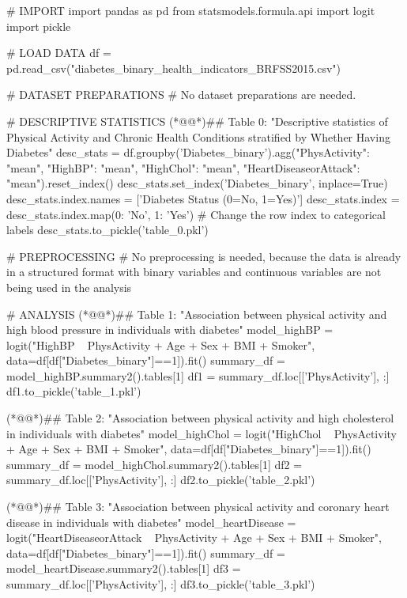 \documentclass[11pt]{article}
\begin{document}
\begin{python}

# IMPORT
import pandas as pd
from statsmodels.formula.api import logit
import pickle

# LOAD DATA
df = pd.read_csv("diabetes_binary_health_indicators_BRFSS2015.csv")

# DATASET PREPARATIONS
# No dataset preparations are needed.

# DESCRIPTIVE STATISTICS
(*@@*)## Table 0: "Descriptive statistics of Physical Activity and Chronic Health Conditions stratified by Whether Having Diabetes"
desc_stats = df.groupby('Diabetes_binary').agg({"PhysActivity": "mean", 
                                                "HighBP": "mean",
                                                "HighChol": "mean",
                                                "HeartDiseaseorAttack": "mean"}).reset_index()
desc_stats.set_index('Diabetes_binary', inplace=True)
desc_stats.index.names = ['Diabetes Status (0=No, 1=Yes)']
desc_stats.index = desc_stats.index.map({0: 'No', 1: 'Yes'})  # Change the row index to categorical labels
desc_stats.to_pickle('table_0.pkl')

# PREPROCESSING 
# No preprocessing is needed, because the data is already in a structured format with binary variables and continuous variables are not being used in the analysis

# ANALYSIS
(*@@*)## Table 1: "Association between physical activity and high blood pressure in individuals with diabetes"
model_highBP = logit("HighBP ~ PhysActivity + Age + Sex + BMI + Smoker", data=df[df["Diabetes_binary"]==1]).fit()
summary_df = model_highBP.summary2().tables[1]
df1 = summary_df.loc[['PhysActivity'], :]
df1.to_pickle('table_1.pkl')

(*@@*)## Table 2: "Association between physical activity and high cholesterol in individuals with diabetes"
model_highChol = logit("HighChol ~ PhysActivity + Age + Sex + BMI + Smoker", data=df[df["Diabetes_binary"]==1]).fit()
summary_df = model_highChol.summary2().tables[1]
df2 = summary_df.loc[['PhysActivity'], :]
df2.to_pickle('table_2.pkl')

(*@@*)## Table 3: "Association between physical activity and coronary heart disease in individuals with diabetes"
model_heartDisease = logit("HeartDiseaseorAttack ~ PhysActivity + Age + Sex + BMI + Smoker", data=df[df["Diabetes_binary"]==1]).fit()
summary_df = model_heartDisease.summary2().tables[1]
df3 = summary_df.loc[['PhysActivity'], :]
df3.to_pickle('table_3.pkl')


\end{python}
\end{document}
